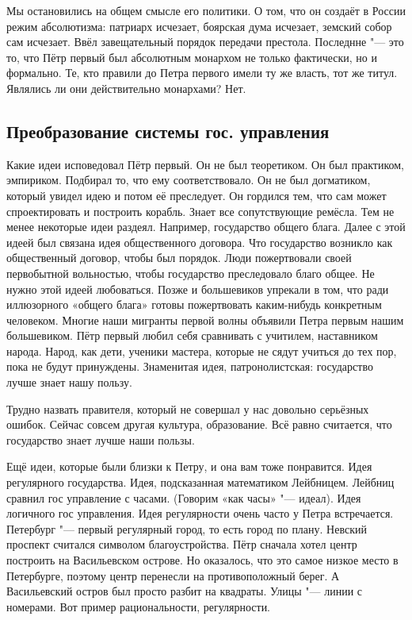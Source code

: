 
Мы остановились на общем смысле его политики. О том, что он создаёт в России режим абсолютизма: патриарх исчезает, боярская дума исчезает, земский собор сам исчезает. Ввёл завещательный порядок передачи престола. Последнне "--- это то, что Пётр первый был абсолютным монархом не только фактически, но и формально. Те, кто правили до Петра первого имели ту же власть, тот же титул. Являлись ли они действительно монархами? Нет.

\subsection{Преобразование системы гос. управления}
Какие идеи исповедовал Пётр первый. Он не был теоретиком. Он был практиком, эмпириком. Подбирал то, что ему соответствовало. Он не был догматиком, который увидел идею и потом её преследует. Он гордился тем, что сам может спроектировать и построить корабль. Знает все сопутствующие ремёсла. Тем не менее некоторые идеи раздеял. Например, государство общего блага. 
Далее с этой идеей был связана идея общественного договора. Что государство возникло как общественный договор, чтобы был порядок. Люди пожертвовали своей первобытной вольностью, чтобы государство преследовало благо общее. Не нужно этой идеей любоваться. Позже и большевиков упрекали в том, что ради иллюзорного «общего блага» готовы пожертвовать каким-нибудь конкретным человеком. Многие наши мигранты первой волны объявили Петра первым нашим большевиком. Пётр первый любил себя сравнивать с учитилем, наставником народа. Народ, как дети, ученики мастера, которые не сядут учиться до тех пор, пока не будут принуждены.
Знаменитая идея, патронолистская: государство лучше знает нашу пользу.

Трудно назвать правителя, который не совершал у нас довольно серьёзных ошибок. Сейчас совсем другая культура, образование. Всё равно считается, что государство знает лучше наши пользы.

Ещё идеи, которые были близки к Петру, и она вам тоже понравится. Идея регулярного государства. Идея, подсказанная математиком Лейбницем. Лейбниц сравнил гос управление с часами. (Говорим «как часы» "--- идеал). Идея логичного гос управления. Идея регулярности очень часто у Петра встречается. Петербург "--- первый регулярный город, то есть город по плану. Невский проспект считался символом благоустройства. Пётр сначала хотел центр построить на Васильевском острове. Но оказалось, что это самое низкое место в Петербурге, поэтому центр перенесли на противоположный берег. А Васильевский остров был просто разбит на квадраты. Улицы "--- линии с номерами. Вот пример рациональности, регулярности.

